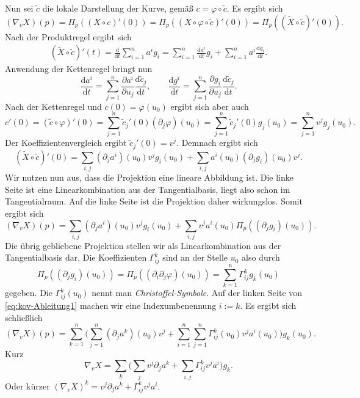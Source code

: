 Nun sei $\tilde c$ die lokale Darstellung der Kurve, gemäß
$c=\varphi\circ\tilde c$. Es ergibt sich
\begin{equation}
(\nabla_v X)(p) = \Pi_p((X\circ c)'(0))
= \Pi_p((X\circ\varphi\circ\tilde c)'(0))
= \Pi_p((\tilde X\circ\tilde c)'(0)).
\end{equation}
Nach der Produktregel ergibt sich
\begin{gather}
(\tilde X\circ\tilde c)'(t)
= \frac{\mathrm d}{\mathrm dt} \sum_{i=1}^n a^i g_i
= \sum_{i=1}^n \frac{\mathrm da^i}{\mathrm dt}g_i
+ \sum_{i=1}^n a^i\frac{\mathrm dg_i}{\mathrm dt}.
\end{gather}
Anwendung der Kettenregel bringt nun
\begin{equation}
\frac{\mathrm da^i}{\mathrm dt}
= \sum_{j=1}^n \frac{\partial a^i}{\partial u_j}
\frac{\mathrm d\tilde c_j}{\mathrm dt},\qquad
\frac{\mathrm dg^i}{\mathrm dt}
= \sum_{j=1}^n \frac{\partial g_i}{\partial u_j}
\frac{\mathrm d\tilde c_j}{\mathrm dt}.
\end{equation}
Nach der Kettenregel und $c(0)=\varphi(u_0)$ ergibt sich aber auch
\begin{equation}
c'(0) = (\tilde c\circ\varphi)'(0)
= \sum_{j=1}^n \tilde c_j'(0)(\partial_j\varphi)(u_0)
= \sum_{j=1}^n \tilde c_j'(0)g_j(u_0)
= \sum_{j=1}^n v^j g_j(u_0).
\end{equation}
Der Koeffizientenvergleich ergibt $\tilde c_j'(0)=v^j$. Demnach ergibt sich
\begin{equation}
(\tilde X\circ\tilde c)'(0)
= \sum_{i,j} (\partial_j a^i)(u_0) v^j g_i(u_0)
+ \sum_{i,j} a^i(u_0) (\partial_j g_i)(u_0) v^j.
\end{equation}
Wir nutzen nun aus, dass die Projektion eine lineare Abbildung ist.
Die linke Seite ist eine Linearkombination aus der Tangentialbasis,
liegt also schon im Tangentialraum. Auf die linke Seite ist die
Projektion daher wirkungslos. Somit ergibt sich
\begin{equation}\label{eq:kov-Ableitung1}
(\nabla_v X)(p) = \sum_{i,j} (\partial_j a^i)(u_0) v^j g_i(u_0)
+ \sum_{i,j} v^j a^i(u_0) \Pi_p((\partial_j g_i)(u_0)).
\end{equation}
Die übrig gebliebene Projektion stellen wir als Linearkombination
aus der Tangentialbasis dar. Die Koeffizienten $\Gamma_{ij}^k$
sind an der Stelle $u_0$ also durch%
\begin{equation}
\Pi_p((\partial_j g_i)(u_0))
= \Pi_p((\partial_i\partial_j\varphi)(u_0))
= \sum_{k=1}^n \Gamma_{ij}^k g_k(u_0)
\end{equation}
gegeben. Die $\Gamma_{ij}^k(u_0)$ nennt man \emph{Christoffel-Symbole}.
Auf der linken Seite von \eqref{eq:kov-Ableitung1} machen wir eine
Indexumbenennung $i:=k$. Es ergibt sich schließlich
\begin{equation}
(\nabla_v X)(p)
= \sum_{k=1}^n \bigg(\sum_{j=1}^n (\partial_j a^k)(u_0)v^j
+\sum_{i=1}^n\sum_{j=1}^n \Gamma_{ij}^k(u_0) v^j a^i(u_0)\bigg)g_k(u_0).
\end{equation}
Kurz
\begin{equation}
\nabla_v X = \sum_k \bigg(\sum_j v^j\partial_j a^k
+\sum_{i,j} \Gamma_{ij}^k v^j a^i\bigg)g_k.
\end{equation}
Oder kürzer $(\nabla_v X)^k = v^j \partial_j a^k + \Gamma_{ij}^k v^j a^i$.
